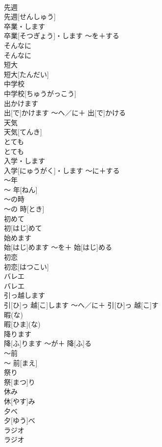 \documentclass[8pt]{extreport}
\begin{document}
\begin{CJK}{UTF8}{min}
\\	先週	
\\	先週[せんしゅう]		
\\	卒業・します	
\\	卒業[そつぎょう]・します	〜を＋する	
\\	そんなに	
\\	そんなに		
\\	短大	
\\	短大[たんだい]		
\\	中学校	
\\	中学校[ちゅうがっこう]		
\\	出かけます	
\\	出[で]かけます	〜へ／に＋ 出[で]かける	
\\	天気	
\\	天気[てんき]		
\\	とても	
\\	とても		
\\	入学・します	
\\	入学[にゅうがく]・します	〜に＋する	
\\	〜年	
\\	〜 年[ねん]		
\\	〜の時	
\\	〜の 時[とき]		
\\	初めて	
\\	初[はじ]めて		
\\	始めます	
\\	始[はじ]めます	〜を＋ 始[はじ]める	
\\	初恋	
\\	初恋[はつこい]		
\\	バレエ	
\\	バレエ		
\\	引っ越します	
\\	引[ひ]っ 越[こ]します	〜へ／に＋ 引[ひ]っ 越[こ]す	
\\	暇(な)	
\\	暇[ひま](な)		
\\	降ります	
\\	降[ふ]ります	〜が＋ 降[ふ]る	
\\	〜前	
\\	〜 前[まえ]		
\\	祭り	
\\	祭[まつ]り		
\\	休み	
\\	休[やす]み		
\\	夕べ	
\\	夕[ゆう]べ		
\\	ラジオ	
\\	ラジオ		

\end{CJK}
\end{document}
